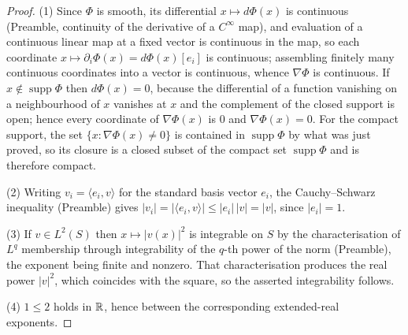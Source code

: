 \begin{proof}
(1)  Since $\Phi$ is smooth, its differential $x\mapsto d\Phi(x)$ is continuous
(Preamble, continuity of the derivative of a $C^\infty$ map), and evaluation of
a continuous linear map at a fixed vector is continuous in the map, so each
coordinate $x\mapsto\partial_i\Phi(x)=d\Phi(x)[e_i]$ is continuous; assembling
finitely many continuous coordinates into a vector is continuous, whence
$\nabla\Phi$ is continuous.  If $x\notin\operatorname{supp}\Phi$ then
$d\Phi(x)=0$, because the differential of a function vanishing on a
neighbourhood of $x$ vanishes at $x$ and the complement of the closed support
is open; hence every coordinate of $\nabla\Phi(x)$ is $0$ and
$\nabla\Phi(x)=0$.  For the compact support, the set
$\{x:\nabla\Phi(x)\neq0\}$ is contained in $\operatorname{supp}\Phi$ by what
was just proved, so its closure is a closed subset of the compact set
$\operatorname{supp}\Phi$ and is therefore compact.

(2)  Writing $v_i=\langle e_i,v\rangle$ for the standard basis vector $e_i$,
the Cauchy--Schwarz inequality (Preamble) gives
$|v_i|=|\langle e_i,v\rangle|\le|e_i|\,|v|=|v|$, since $|e_i|=1$.

(3)  If $v\in L^2(S)$ then $x\mapsto|v(x)|^{2}$ is integrable on $S$ by the
characterisation of $L^q$ membership through integrability of the $q$-th power
of the norm (Preamble), the exponent being finite and nonzero.  That
characterisation produces the real power $|v|^{2}$, which coincides with the
square, so the asserted integrability follows.

(4)  $1\le2$ holds in $\mathbb{R}$, hence between the corresponding extended-real
exponents.
\end{proof}
